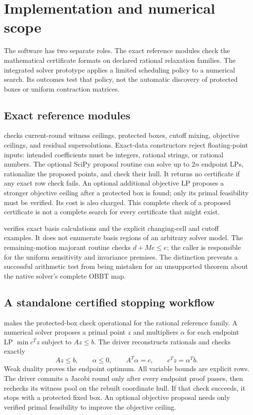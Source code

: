 \section{Implementation and numerical scope}\label{sec:implementation}

The software has two separate roles. The exact reference modules check
the mathematical certificate formats on declared rational relaxation
families. The integrated solver prototype applies a limited scheduling
policy to a numerical search. Its outcomes test that policy, not the
automatic discovery of protected boxes or uniform contraction matrices.

\subsection{Exact reference modules}

 checks
current-round witness ceilings, protected boxes, cutoff mixing, objective
ceilings, and residual supersolutions. Exact-data constructors reject
floating-point inputs: intended coefficients must be integers, rational
strings, or rational numbers. The optional SciPy proposal routine can
solve up to $2n$ endpoint LPs, rationalize the proposed points, and check
their hull. It returns no certificate if any exact row check fails.
An optional additional objective LP proposes a stronger objective ceiling
after a protected box is found; only its primal feasibility must be
verified. Its cost is also charged.
This complete check of a proposed certificate is not a complete search
for every certificate that might exist.

verifies exact basis calculations and the explicit changing-cell and
cutoff examples. It does not enumerate basis regions of an arbitrary
solver model. The remaining-motion majorant routine checks
$d+Me\le e$; the caller is responsible for the uniform sensitivity
and invariance premises. The distinction prevents a successful arithmetic
test from being mistaken for an unsupported theorem about the native
solver's complete OBBT map.

\subsection{A standalone certified stopping workflow}

makes the protected-box check operational for the rational reference
family. A numerical solver proposes a primal point $z$ and multipliers
$\alpha$ for each endpoint LP $\min c^Tz$ subject to $Az\le b$.
The driver reconstructs rationals and checks exactly
\[
 Az\le b,\qquad \alpha\le0,\qquad
 A^T\alpha=c,\qquad c^Tz=\alpha^Tb.
\]
Weak duality proves the endpoint optimum. All variable bounds are
explicit rows. The driver commits a Jacobi round only after every
endpoint proof passes, then rechecks its witness pool on the rebuilt
coordinate hull. If that check succeeds, it stops with a protected
fixed box. An optional objective proposal needs only verified primal
feasibility to improve the objective ceiling.

